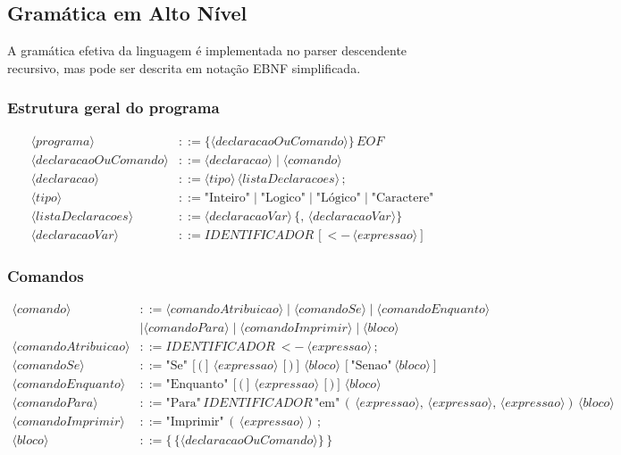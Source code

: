 \documentclass[12pt,a4paper]{article}
\begin{document}
\subsection{Gramática em Alto Nível}

A gramática efetiva da linguagem é implementada no parser descendente recursivo, mas pode ser descrita em notação EBNF simplificada.

\subsubsection*{Estrutura geral do programa}

\begin{align*}
\langle programa \rangle &::= \{ \langle declaracaoOuComando \rangle \} \, EOF \\
\langle declaracaoOuComando \rangle &::= \langle declaracao \rangle \mid \langle comando \rangle \\
\langle declaracao \rangle &::= \langle tipo \rangle \, \langle listaDeclaracoes \rangle \, ; \\
\langle tipo \rangle &::= \text{"Inteiro"} \mid \text{"Logico"} \mid \text{"Lógico"} \mid \text{"Caractere"} \\
\langle listaDeclaracoes \rangle &::= \langle declaracaoVar \rangle \, \{ , \, \langle declaracaoVar \rangle \} \\
\langle declaracaoVar \rangle &::= IDENTIFICADOR \, [ <- \, \langle expressao \rangle ]
\end{align*}

\subsubsection*{Comandos}

\begin{align*}
\langle comando \rangle &::= \langle comandoAtribuicao \rangle \mid \langle comandoSe \rangle \mid \langle comandoEnquanto \rangle \\
&\mid \langle comandoPara \rangle \mid \langle comandoImprimir \rangle \mid \langle bloco \rangle \\
\langle comandoAtribuicao \rangle &::= IDENTIFICADOR \ <- \ \langle expressao \rangle \, ; \\
\langle comandoSe \rangle &::= \text{"Se"} \, [ ( ] \, \langle expressao \rangle \, [ ) ] \, \langle bloco \rangle \, [ \text{"Senao"} \, \langle bloco \rangle ] \\
\langle comandoEnquanto \rangle &::= \text{"Enquanto"} \, [ ( ] \, \langle expressao \rangle \, [ ) ] \, \langle bloco \rangle \\
\langle comandoPara \rangle &::= \text{"Para"} \, IDENTIFICADOR \, \text{"em"} \, ( \, \langle expressao \rangle , \, \langle expressao \rangle , \, \langle expressao \rangle ) \, \langle bloco \rangle \\
\langle comandoImprimir \rangle &::= \text{"Imprimir"} \, ( \, \langle expressao \rangle ) \, ; \\
\langle bloco \rangle &::= \{ \, \{ \langle declaracaoOuComando \rangle \} \, \}
\end{align*}
\end{document}
